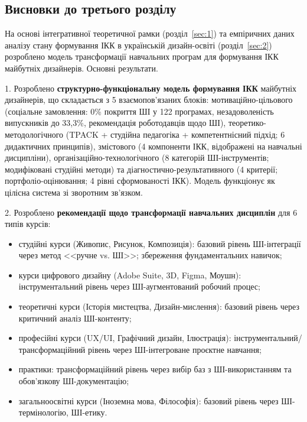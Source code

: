 \subsection*{Висновки до третього розділу}

На основі інтегративної теоретичної рамки (розділ~\ref{sec:1}) та емпіричних даних аналізу стану формування ІКК в українській дизайн-освіті (розділ~\ref{sec:2}) розроблено модель трансформації навчальних програм для формування ІКК майбутніх дизайнерів. Основні результати.

1. Розроблено \textbf{структурно-функціональну модель формування ІКК} майбутніх дизайнерів, що складається з 5 взаємопов'язаних блоків: мотиваційно-цільового (соціальне замовлення: 0\% покриття ШІ у 122 програмах, незадоволеність випускників до 33,3\%, рекомендація роботодавців щодо ШІ), теоретико-методологічного (TPACK + студійна педагогіка + компетентнісний підхід; 6 дидактичних принципів), змістового (4 компоненти ІКК, відображені на навчальні дисципліни), організаційно-технологічного (8 категорій ШІ-інструментів; модифіковані студійні методи) та діагностично-результативного (4 критерії; портфоліо-оцінювання; 4 рівні сформованості ІКК). Модель функціонує як цілісна система зі зворотним зв'язком.

2. Розроблено \textbf{рекомендації щодо трансформації навчальних дисциплін} для 6 типів курсів:
\begin{itemize}
    \item студійні курси (Живопис, Рисунок, Композиція): базовий рівень ШІ-інтеграції через метод <<ручне vs. ШІ>>; збереження фундаментальних навичок;
    \item курси цифрового дизайну (Adobe Suite, 3D, Figma, Моушн): інструментальний рівень через ШІ-аугментований робочий процес;
    \item теоретичні курси (Історія мистецтва, Дизайн-мислення): базовий рівень через критичний аналіз ШІ-контенту;
    \item професійні курси (UX/UI, Графічний дизайн, Ілюстрація): інструментальний/трансформаційний рівень через ШІ-інтегроване проєктне навчання;
    \item практики: трансформаційний рівень через вибір баз з ШІ-використанням та обов'язкову ШІ-документацію;
    \item загальноосвітні курси (Іноземна мова, Філософія): базовий рівень через ШІ-термінологію, ШІ-етику.
\end{itemize}

